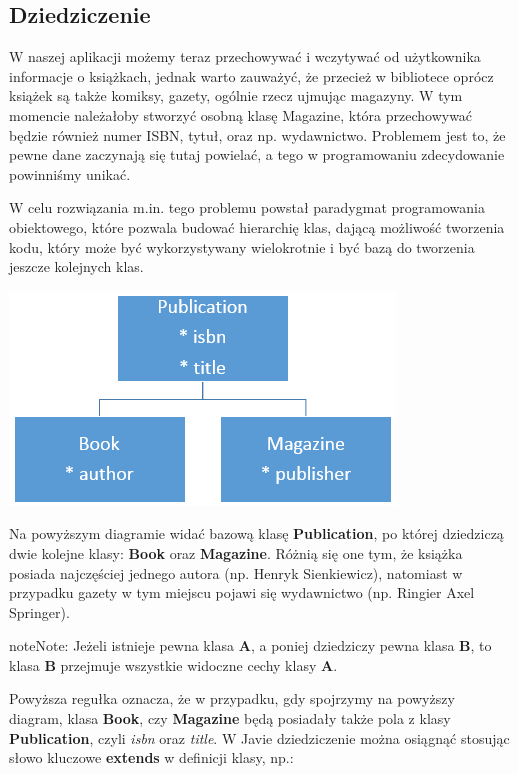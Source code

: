 \documentclass[letterpaper,10pt,english]{sphinxmanual}
\begin{document}
\subsection{Dziedziczenie}
\label{obiekty2:dziedziczenie}
W naszej aplikacji możemy teraz przechowywać i wczytywać od użytkownika informacje o książkach, jednak warto zauważyć, że przecież w bibliotece oprócz książek są także komiksy, gazety, ogólnie rzecz ujmując magazyny. W tym momencie należałoby stworzyć osobną klasę Magazine, która przechowywać będzie również numer ISBN, tytuł, oraz np. wydawnictwo. Problemem jest to, że pewne dane zaczynają się tutaj powielać, a tego w programowaniu zdecydowanie powinniśmy unikać.

W celu rozwiązania m.in. tego problemu powstał paradygmat programowania obiektowego, które pozwala budować hierarchię klas, dającą możliwość tworzenia kodu, który może być wykorzystywany wielokrotnie i być bazą do tworzenia jeszcze kolejnych klas.

{\hfill\includegraphics{inheritance.png}\hfill}

Na powyższym diagramie widać bazową klasę \textbf{Publication}, po której dziedziczą dwie kolejne klasy: \textbf{Book} oraz \textbf{Magazine}. Różnią się one tym, że książka posiada najczęściej jednego autora (np. Henryk Sienkiewicz), natomiast w przypadku gazety w tym miejscu pojawi się wydawnictwo (np. Ringier Axel Springer).

\begin{notice}{note}{Note:}
Jeżeli istnieje pewna klasa \textbf{A}, a poniej dziedziczy pewna klasa \textbf{B}, to klasa \textbf{B} przejmuje wszystkie widoczne cechy klasy \textbf{A}.
\end{notice}

Powyższa regułka oznacza, że w przypadku, gdy spojrzymy na powyższy diagram, klasa \textbf{Book}, czy \textbf{Magazine} będą posiadały także pola z klasy \textbf{Publication}, czyli \emph{isbn} oraz \emph{title}. W Javie dziedziczenie można osiągnąć stosując słowo kluczowe \textbf{extends} w definicji klasy, np.:
\end{document}
